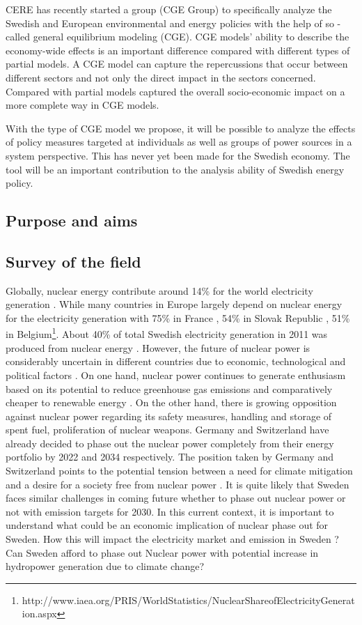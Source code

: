 \documentclass[10pt,a4paper]{article}
\begin{document}
CERE has recently started a group (CGE Group) to specifically analyze the Swedish and European environmental and energy policies with the help of so -called general equilibrium modeling (CGE). CGE models' ability to describe the economy-wide effects is an important difference compared with different types of partial models. A CGE model can capture the repercussions that occur between different sectors and not only the direct impact in the sectors concerned. Compared with partial models captured the overall socio-economic impact on a more complete way in CGE models.

With the type of CGE model we propose, it will be possible to analyze the effects of policy measures targeted at individuals as well as groups of power sources in a system perspective. This has never yet been made for the Swedish economy. The tool will be an important contribution to the analysis ability of Swedish energy policy.
\subsection{Purpose and aims}
\subsection{Survey of the field}
Globally, nuclear energy contribute around 14\% for the world electricity generation \citep{OECD2012}. While many countries in Europe largely depend on nuclear energy for the electricity generation with 75\% in France , 54\% in Slovak Republic , 51\% in Belgium\footnote{http://www.iaea.org/PRIS/WorldStatistics/NuclearShareofElectricityGeneration.aspx}. About 40\% of total Swedish electricity generation in 2011 was produced from nuclear energy \citep{SEA2012}. However, the future of nuclear power is considerably uncertain in different countries due to economic, technological and political factors \citep{Joskow2012}. On one hand, nuclear power continues to generate enthusiasm based on its potential to reduce greenhouse gas emissions and comparatively cheaper to renewable energy \citep{Davis2012, Renssen2013}. On the other hand, there is growing opposition against nuclear power regarding its safety measures, handling and storage of spent fuel, proliferation of nuclear weapons. Germany and Switzerland have already decided to phase out the nuclear power completely from their energy portfolio by  2022 and 2034 respectively. The position taken by Germany and Switzerland points to the potential tension between a need for climate mitigation and a desire for a society free from nuclear power \citep{Glomsrod2013}. It is quite likely that Sweden faces similar challenges in coming future whether to phase out nuclear power or not with emission targets for 2030. In this current context, it is important to understand what could be an economic implication of nuclear phase out for Sweden. How this will impact the electricity market and emission in Sweden ? Can Sweden afford to phase out Nuclear power with potential increase in hydropower generation due to climate change?
\end{document}
